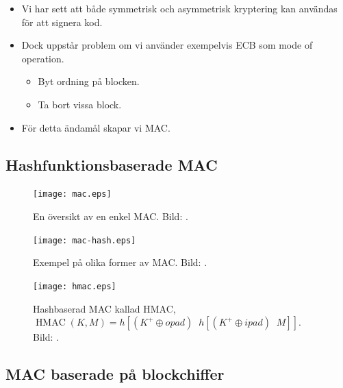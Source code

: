 \documentclass{beamer}
\theoremstyle{definition}
\DeclareMathOperator{\xor}{\oplus}
\DeclareMathOperator{\hmac}{HMAC}
\DeclareMathOperator{\concat}{||}
\begin{document}
\begin{frame}{\insertsubsectionhead}
  \begin{itemize}
    \item Vi har sett att både symmetrisk och asymmetrisk kryptering kan 
      användas för att signera kod.

    \item Dock uppstår problem om vi använder exempelvis ECB som mode of 
      operation.
      \begin{itemize}
        \item Byt ordning på blocken.
        \item Ta bort vissa block.
      \end{itemize}

    \item För detta ändamål skapar vi MAC.

  \end{itemize}
\end{frame}

\subsection{Hashfunktionsbaserade MAC}

\begin{frame}{\insertsubsectionhead}
  \begin{figure}
    \texttt{[image: mac.eps]}
    \caption{En översikt av en enkel MAC.
      Bild: \citep{Stallings2013nse}.}
  \end{figure}
\end{frame}

\begin{frame}{\insertsubsectionhead}
  \begin{figure}
    \texttt{[image: mac-hash.eps]}
    \caption{Exempel på olika former av MAC.
      Bild: \citep{Stallings2013nse}.}
  \end{figure}
\end{frame}

\begin{frame}{\insertsubsectionhead}
  \begin{figure}
    \texttt{[image: hmac.eps]}
    \caption{Hashbaserad MAC kallad HMAC, \(\hmac(K, M) = h[ (K^+\xor opad) 
      \concat h[ (K^+\xor ipad) \concat M]]\).
      Bild: \citep{Stallings2013nse}.}
  \end{figure}
\end{frame}

\subsection{MAC baserade på blockchiffer}
\end{document}

